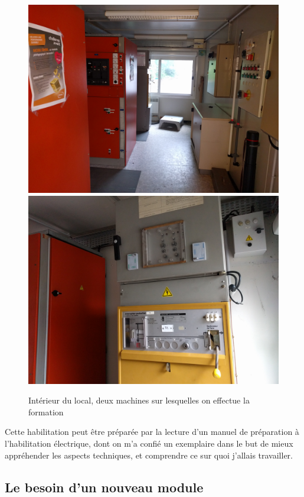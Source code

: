 \documentclass[a4paper]{article}
\begin{document}
        \begin{figure}[H]
            \centering
            \includegraphics[scale=0.05]{img/habilitation1}
            \includegraphics[scale=0.05]{img/habilitation2}
            \caption{Intérieur du local, deux machines sur lesquelles on effectue la formation}
        \end{figure}

        Cette habilitation peut être préparée par la lecture d'un manuel de préparation à l'habilitation électrique, dont on m'a confié un exemplaire dans le but de mieux appréhender les aspects techniques, et comprendre ce sur quoi j'allais travailler.

    \subsection{Le besoin d'un nouveau module}
\end{document}
